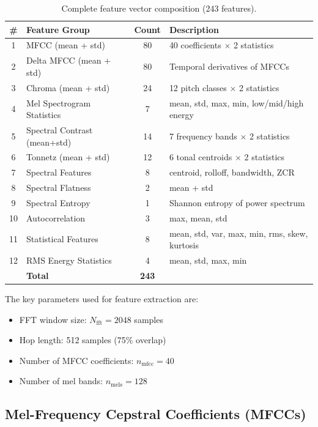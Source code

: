 \documentclass[12pt,a4paper]{report}
\begin{document}
\begin{table}[H]
\centering
\caption{Complete feature vector composition (243 features).}
\label{tab:features}
\begin{tabular}{clcl}
\toprule
\textbf{\#} & \textbf{Feature Group} & \textbf{Count} & \textbf{Description} \\
\midrule
1  & MFCC (mean + std)            & 80 & 40 coefficients $\times$ 2 statistics \\
2  & Delta MFCC (mean + std)      & 80 & Temporal derivatives of MFCCs \\
3  & Chroma (mean + std)          & 24 & 12 pitch classes $\times$ 2 statistics \\
4  & Mel Spectrogram Statistics   & 7  & mean, std, max, min, low/mid/high energy \\
5  & Spectral Contrast (mean+std) & 14 & 7 frequency bands $\times$ 2 statistics \\
6  & Tonnetz (mean + std)         & 12 & 6 tonal centroids $\times$ 2 statistics \\
7  & Spectral Features            & 8  & centroid, rolloff, bandwidth, ZCR \\
8  & Spectral Flatness            & 2  & mean + std \\
9  & Spectral Entropy             & 1  & Shannon entropy of power spectrum \\
10 & Autocorrelation              & 3  & max, mean, std \\
11 & Statistical Features         & 8  & mean, std, var, max, min, rms, skew, kurtosis \\
12 & RMS Energy Statistics        & 4  & mean, std, max, min \\
\midrule
   & \textbf{Total}               & \textbf{243} & \\
\bottomrule
\end{tabular}
\end{table}

The key parameters used for feature extraction are:
\begin{itemize}
    \item FFT window size: $N_{\text{fft}} = 2048$ samples
    \item Hop length: 512 samples (75\% overlap)
    \item Number of MFCC coefficients: $n_{\text{mfcc}} = 40$
    \item Number of mel bands: $n_{\text{mels}} = 128$
\end{itemize}

\subsection{Mel-Frequency Cepstral Coefficients (MFCCs)}
\end{document}
